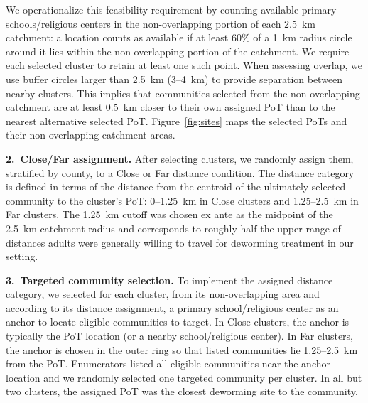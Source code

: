 \documentclass[12pt,a4paper]{article}
\begin{document}
We operationalize this feasibility requirement by counting available primary schools/religious centers in the non-overlapping portion of each 2.5~km catchment: a location counts as available if at least 60\% of a 1~km radius circle around it lies within the non-overlapping portion of the catchment. We require each selected cluster to retain at least one such point. When assessing overlap, we use buffer circles larger than 2.5~km (3--4~km) to provide separation between nearby clusters. This implies that communities selected from the non-overlapping catchment are at least 0.5~km closer to their own assigned PoT than to the nearest alternative selected PoT. Figure~\ref{fig:sites} maps the selected PoTs and their non-overlapping catchment areas.

\vspace{0.4em}
\noindent\textbf{2.\ Close/Far assignment.}
After selecting clusters, we randomly assign them, stratified by county, to a Close or Far distance condition. The distance category is defined in terms of the distance from the centroid of the ultimately selected community to the cluster's PoT: 0--1.25~km in Close clusters and 1.25--2.5~km in Far clusters. The 1.25~km cutoff was chosen ex ante as the midpoint of the 2.5~km catchment radius and corresponds to roughly half the upper range of distances adults were generally willing to travel for deworming treatment in our setting.

\vspace{0.4em}
\noindent\textbf{3.\ Targeted community selection.}
To implement the assigned distance category, we selected for each cluster, from its non-overlapping area and according to its distance assignment, a primary school/religious center as an anchor to locate eligible communities to target. In Close clusters, the anchor is typically the PoT location (or a nearby school/religious center). In Far clusters, the anchor is chosen in the outer ring so that listed communities lie 1.25--2.5~km from the PoT. Enumerators listed all eligible communities near the anchor location and we randomly selected one targeted community per cluster. In all but two clusters, the assigned PoT was the closest deworming site to the community. 
\end{document}
